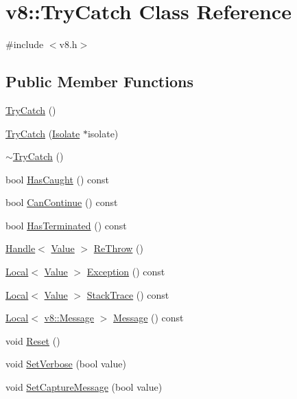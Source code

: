 \hypertarget{classv8_1_1TryCatch}{}\section{v8\+:\+:Try\+Catch Class Reference}
\label{classv8_1_1TryCatch}


{\ttfamily \#include $<$v8.\+h$>$}

\subsection*{Public Member Functions}
\begin{DoxyCompactItemize}
\item 
\hyperlink{classv8_1_1TryCatch_adc9b1b11e73b0325df727914c348053d}{Try\+Catch} ()
\item 
\hyperlink{classv8_1_1TryCatch_a623ce624491b383fae60c05d2aeefb1a}{Try\+Catch} (\hyperlink{classv8_1_1Isolate}{Isolate} $\ast$isolate)
\item 
\hyperlink{classv8_1_1TryCatch_a2c9ad4b40d17dd31c6dd020736b30679}{$\sim$\+Try\+Catch} ()
\item 
bool \hyperlink{classv8_1_1TryCatch_a48f704fbf2b82564b5d2a4ff596e4137}{Has\+Caught} () const 
\item 
bool \hyperlink{classv8_1_1TryCatch_a2ec467d4653d26c064d749cab98791cb}{Can\+Continue} () const 
\item 
bool \hyperlink{classv8_1_1TryCatch_a7e012477ac47db9480f85d55427987c7}{Has\+Terminated} () const 
\item 
\hyperlink{classv8_1_1Handle}{Handle}$<$ \hyperlink{classv8_1_1Value}{Value} $>$ \hyperlink{classv8_1_1TryCatch_a4a7506617800bbc49c3c08bbfefb9c2d}{Re\+Throw} ()
\item 
\hyperlink{classv8_1_1Local}{Local}$<$ \hyperlink{classv8_1_1Value}{Value} $>$ \hyperlink{classv8_1_1TryCatch_a99c425f29b3355b4294cbe762377f99b}{Exception} () const 
\item 
\hyperlink{classv8_1_1Local}{Local}$<$ \hyperlink{classv8_1_1Value}{Value} $>$ \hyperlink{classv8_1_1TryCatch_a1ee3e6ee74a4fc50185443ccdc4d3ae7}{Stack\+Trace} () const 
\item 
\hyperlink{classv8_1_1Local}{Local}$<$ \hyperlink{classv8_1_1Message}{v8\+::\+Message} $>$ \hyperlink{classv8_1_1TryCatch_a2811e500fbb906ee505895a3d94fc66f}{Message} () const 
\item 
void \hyperlink{classv8_1_1TryCatch_a3aae8acab4c99b374b7d782763d4c8e1}{Reset} ()
\item 
void \hyperlink{classv8_1_1TryCatch_a032cd889d76bd596e2616df11ced8682}{Set\+Verbose} (bool value)
\item 
void \hyperlink{classv8_1_1TryCatch_a541b8fa6951bd5a439692c22d5c7b73c}{Set\+Capture\+Message} (bool value)
\end{DoxyCompactItemize}
